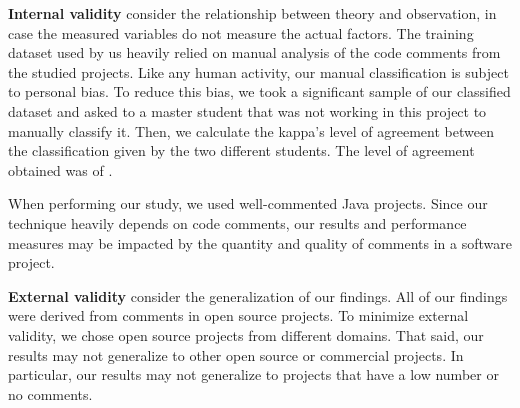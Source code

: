 \noindent\textbf{Internal validity} consider the relationship between theory and observation, in case the measured variables do not measure the actual factors. The training dataset used by us heavily relied on manual analysis of the code comments from the studied projects. Like any human activity, our manual classification is subject to personal bias. To reduce this bias, we took a significant sample of our classified dataset and asked to a master student that was not working in this project to manually classify it. Then, we calculate the kappa's level of agreement between the classification given by the two different students. The level of agreement obtained was of \todo{}.  

When performing our study, we used well-commented Java projects. Since our technique heavily depends on code comments, our results and performance measures may be impacted by the quantity and quality of comments in a software project.  

\noindent \textbf{External validity} consider the generalization of our findings. All of our findings were derived from comments in open source projects. To minimize external validity, we chose open source projects from different domains. That said, our results may not generalize to other open source or commercial projects. In particular, our results may not generalize to projects that have a low number or no comments.
